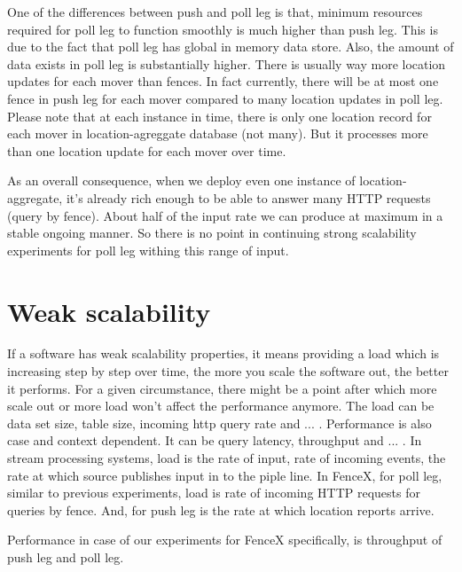 \documentclass[a4]{report}
\begin{document}
    One of the differences between push and poll leg is that, minimum resources required for poll leg to function
    smoothly is much higher than push leg.
    This is due to the fact that poll leg has global in memory data store.
    Also, the amount of data exists in poll leg is substantially higher.
    There is usually way more location updates for each mover than fences.
    In fact currently, there will be at most one fence in push leg for each mover compared to many location updates
    in poll leg.
    Please note that at each instance in time, there is only one location record for each mover in location-agreggate
    database (not many).
    But it processes more than one location update for each mover over time.

    As an overall consequence, when we deploy even one instance of location-aggregate, it's already rich enough to be
    able to answer many HTTP requests (query by fence).
    About half of the input rate we can produce at maximum in a stable ongoing manner.
    So there is no point in continuing strong scalability experiments for poll leg withing this range of input.





    \section{Weak scalability}
    If a software has weak scalability properties, it means providing a load which is increasing step by step over
    time, the more you scale the software out, the better it performs.
    For a given circumstance, there might be a point after which more scale out or more load won't affect
    the performance anymore.
    The load can be data set size, table size, incoming http query rate and ... .
    Performance is also case and context dependent.
    It can be query latency, throughput and ... .
    In stream processing systems, load is the rate of input, rate of incoming events, the rate at
    which source publishes input in to the piple line.
    In FenceX, for poll leg, similar to previous experiments, load is rate of incoming HTTP requests for queries by
    fence.
    And, for push leg is the rate at which location reports arrive.

    Performance in case of our experiments for FenceX specifically, is throughput of push leg and poll leg.
\end{document}
